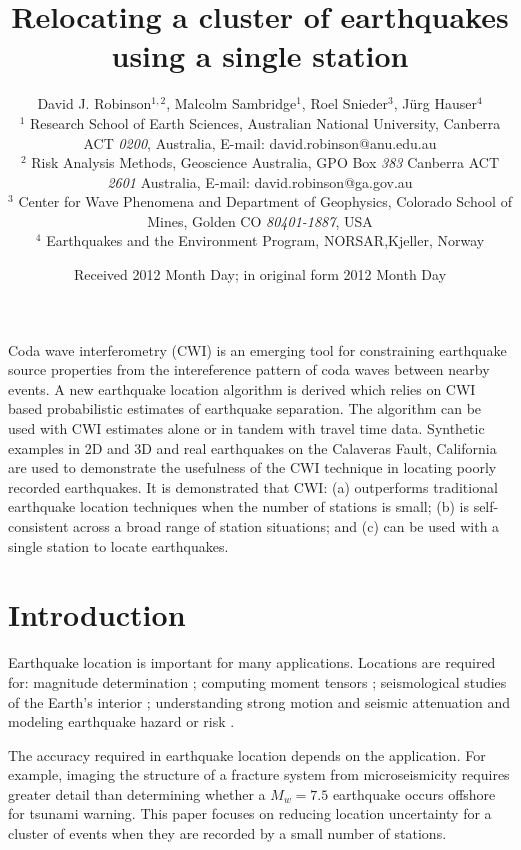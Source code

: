 \documentclass[extra]{gji}
\title{Relocating a cluster of earthquakes using a single station}
\author[D.J. Robinson, M. Sambridge, R. Snieder and J Hauser]
  {David J. Robinson$^{1,2}$, Malcolm Sambridge$^{1}$, Roel Snieder$^{3}$, J\"urg Hauser$^{4}$ \\
  $^1$ Research School of Earth Sciences, Australian National
    University, Canberra ACT \emph{0200}, Australia, E-mail: david.robinson@anu.edu.au \\
$^2$  Risk Analysis Methods, Geoscience Australia, GPO Box \emph{383} Canberra ACT \emph{2601} Australia, E-mail: david.robinson@ga.gov.au\\
$^3$ Center for Wave Phenomena and Department of Geophysics, Colorado School of Mines, Golden CO \emph{80401-1887}, USA \\
$^4$ Earthquakes and the Environment Program, NORSAR,Kjeller, Norway}
\date{Received 2012 Month Day; in original form 2012 Month Day}
\begin{document}
\label{firstpage}

\maketitle


\begin{summary}
 Coda wave interferometry (CWI) is an emerging tool for constraining 
earthquake source properties from the intereference pattern of coda waves between nearby
events. A new earthquake location algorithm is derived which relies on CWI based probabilistic estimates 
of earthquake separation. The algorithm can be used with CWI estimates alone or in tandem with travel time
data. Synthetic examples in 2D and 3D and real earthquakes on the 
Calaveras Fault, California are used to demonstrate the usefulness of the CWI technique in locating 
poorly recorded earthquakes. It is demonstrated that CWI: (a) outperforms traditional earthquake location 
techniques when the number of stations is small; (b) is self-consistent across a broad range of station
situations; and (c) can be used with a single station to locate earthquakes.        

\end{summary}


\section{Introduction}

Earthquake location is important for many applications. Locations 
are required for:  magnitude
determination \citep{dr_Richter35a, dr_Gutenberg45a};
computing moment tensors \citep{dr_Sipkin02a};
seismological studies of the Earth's interior 
\citep{dr_Spencer80a, dr_Kennett95a, dr_Curtis02a, dr_Kennett04a};
understanding strong motion and seismic attenuation
\citep{dr_Toro97a, dr_Campbell03a}
 and modeling earthquake hazard or risk
\citep{dr_Frankel00a, dr_Stirling02a, dr_Robinson06b}.

The accuracy required in earthquake location depends on the
application. For example, imaging the structure of a fracture system
from microseismicity requires greater detail than determining
whether a $M_w=7.5$ earthquake occurs offshore for tsunami warning.
 This paper focuses on reducing location uncertainty for 
a cluster of events when they are recorded by a small
number of stations.
\end{document}
